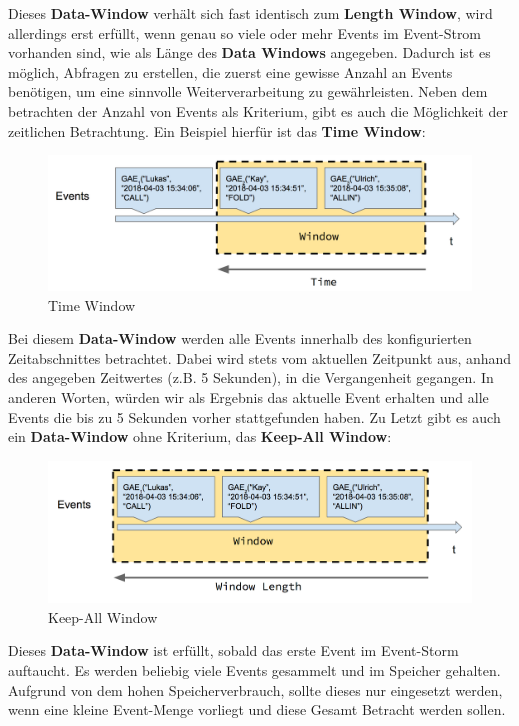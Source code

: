 Dieses \textbf{Data-Window} verhält sich fast identisch zum \textbf{Length Window}, wird allerdings erst erfüllt, wenn genau so viele oder mehr Events im Event-Strom vorhanden sind, wie als Länge des \textbf{Data Windows} angegeben. Dadurch ist es möglich, Abfragen zu erstellen, die zuerst eine gewisse Anzahl an Events benötigen, um eine sinnvolle Weiterverarbeitung zu gewährleisten.
\absatz
Neben dem betrachten der Anzahl von Events als Kriterium, gibt es auch die Möglichkeit der zeitlichen Betrachtung. Ein Beispiel hierfür ist das \textbf{Time Window}:
\begin{figure}[ht]
	\centering
	\includegraphics[width=\textwidth,height=\textheight,keepaspectratio]{images/data_window_time.png}
	\caption{Time Window}
	\label{TimeWindow}
\end{figure}
Bei diesem \textbf{Data-Window} werden alle Events innerhalb des konfigurierten Zeitabschnittes betrachtet.
Dabei wird stets vom aktuellen Zeitpunkt aus, anhand des angegeben Zeitwertes (z.B. 5 Sekunden), in die Vergangenheit gegangen. In anderen Worten, würden wir als Ergebnis das aktuelle Event erhalten und alle Events die bis zu 5 Sekunden vorher stattgefunden haben.
\absatz
Zu Letzt gibt es auch ein \textbf{Data-Window} ohne Kriterium, das \textbf{Keep-All Window}:
\begin{figure}[ht]
	\centering
	\includegraphics[width=\textwidth,height=\textheight,keepaspectratio]{images/data_window_keep_all.png}
	\caption{Keep-All Window}
	\label{KeepAllWindow}
\end{figure}
Dieses \textbf{Data-Window} ist erfüllt, sobald das erste Event im Event-Storm auftaucht. Es werden beliebig viele Events gesammelt und im Speicher gehalten.
Aufgrund von dem hohen Speicherverbrauch, sollte dieses nur eingesetzt werden, wenn eine kleine Event-Menge vorliegt und diese Gesamt Betracht werden sollen.

